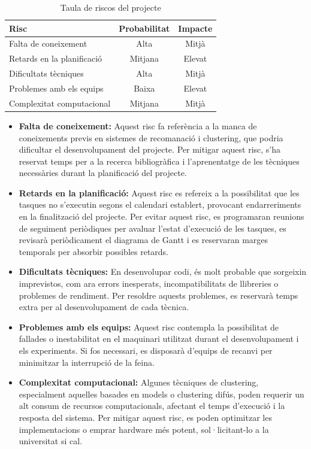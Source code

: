 \documentclass[a4paper,12pt]{report}
\begin{document}
\begin{table}[H]
    \centering
    \begin{tabular}{|l|c|c|}
    \hline
    \textbf{Risc}              & \textbf{Probabilitat} & \textbf{Impacte} \\ \hline
    Falta de coneixement       & Alta                  & Mitjà            \\ \hline
    Retards en la planificació & Mitjana               & Elevat           \\ \hline
    Dificultats tècniques      & Alta                  & Mitjà            \\ \hline
    Problemes amb els equips   & Baixa                 & Elevat           \\ \hline
    Complexitat computacional  & Mitjana               & Mitjà            \\ \hline
    \end{tabular}
    \caption{Taula de riscos del projecte}
    \label{tab:riscos}
\end{table}

\begin{itemize}
    \item \textbf{Falta de coneixement:} Aquest risc fa referència a la manca de coneixements previs en sistemes de recomanació i clustering, que podria dificultar el desenvolupament del projecte.
    Per mitigar aquest risc, s'ha reservat temps per a la recerca bibliogràfica i l'aprenentatge de les tècniques necessàries durant la planificació del projecte.
    \item \textbf{Retards en la planificació:} Aquest risc es refereix a la possibilitat que les tasques no s'executin segons el calendari establert, provocant endarreriments en la finalització del projecte.
    Per evitar aquest risc, es programaran reunions de seguiment periòdiques per avaluar l'estat d'execució de les tasques, es revisarà periòdicament el diagrama de Gantt i es reservaran marges temporals per absorbir possibles retards.
    \item \textbf{Dificultats tècniques:} En desenvolupar codi, és molt probable que sorgeixin imprevistos, com ara errors inesperats, incompatibilitats de llibreries o problemes de rendiment.
    Per resoldre aquests problemes, es reservarà temps extra per al desenvolupament de cada tècnica.
    \item \textbf{Problemes amb els equips:} Aquest risc contempla la possibilitat de fallades o inestabilitat en el maquinari utilitzat durant el desenvolupament i els experiments.
    Si fos necessari, es disposarà d'equips de recanvi per minimitzar la interrupció de la feina.
    \item \textbf{Complexitat computacional:} Algunes tècniques de clustering, especialment aquelles basades en models o clustering difús, poden requerir un alt consum de recursos computacionals, afectant el temps d'execució i la resposta del sistema.
    Per mitigar aquest risc, es poden optimitzar les implementacions o emprar hardware més potent, sol·licitant-lo a la universitat si cal.
\end{itemize}
\end{document}
